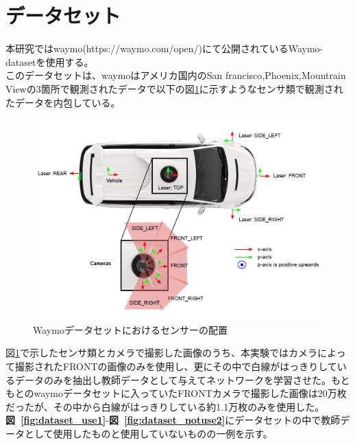 \documentclass[a4j, 11pt]{jreport}
\newcommand{\figref}[1]{\textbf{図~\ref{#1}}}
\begin{document}
\section{データセット}
本研究ではwaymo(https://waymo.com/open/)にて公開されているWaymo-dataset\cite{waymo-web}\cite{waymo-paper}を使用する。\\
このデータセットは、waymoはアメリカ国内のSan francisco,Phoenix,Mountrain Viewの3箇所で観測されたデータで以下の図\ref{fig:waymo-sensor}に示すようなセンサ類で観測されたデータを内包している。
\begin{figure}[H]
	\centering
	\includegraphics[scale=0.5]{./images/datasets/waymo-sensors.png}
	\caption{Waymoデータセットにおけるセンサーの配置}
	\label{fig:waymo-sensor}
\end{figure}
図\ref{fig:waymo-sensor}で示したセンサ類とカメラで撮影した画像のうち、本実験ではカメラによって撮影されたFRONTの画像のみを使用し、更にその中で白線がはっきりしているデータのみを抽出し教師データとして与えてネットワークを学習させた。もともとのwaymoデータセットに入っていたFRONTカメラで撮影した画像は20万枚だったが、その中から白線がはっきりしている約1.1万枚のみを使用した。\\
\figref{fig:dataset_use1}-\figref{fig:dataset_notuse2}にデータセットの中で教師データとして使用したものと使用していないものの一例を示す。
\end{document}
